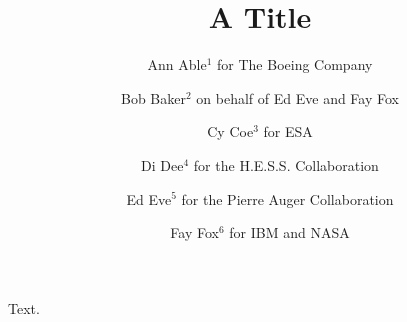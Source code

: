 \documentclass{article}
\title{A Title}
\author{Ann Able$^{1}$ for The Boeing Company \and Bob Baker$^{2}$ on behalf of Ed Eve and Fay Fox \and Cy Coe$^{3}$ for ESA \and Di Dee$^{4}$ for the H.E.S.S. Collaboration \and Ed Eve$^{5}$ for the Pierre Auger Collaboration \and Fay Fox$^{6}$ for IBM and NASA}
\begin{document}
\maketitle
Text.
\end{document}
